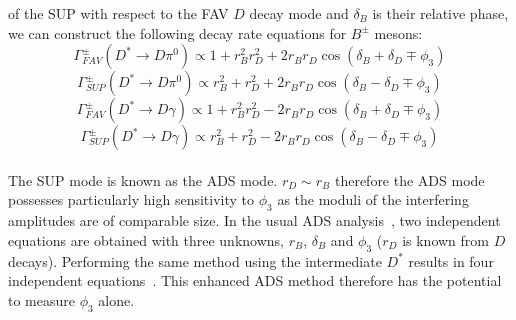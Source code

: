 \documentclass[oneside,12pt]{article}
\begin{document}
of the SUP with respect to the FAV $D$ decay mode and $\delta_{B}$ is their
relative phase, we can construct the following decay rate equations for
$B^{\pm}$ mesons:
  \begin{equation}
    \Gamma_{FAV}^{\pm}(D^{*}\rightarrow D\pi^{0})\propto 1 + r_{B}^{2}r_{D}^{2}
    + 2r_{B}r_{D}\cos(\delta_{B} + \delta_{D} \mp \phi_{3})
    \label{eq:DecayRateADSFAVpi0}
  \end{equation}
  \begin{equation}
    \Gamma_{SUP}^{\pm}(D^{*}\rightarrow D\pi^{0})\propto r_{B}^{2} + r_{D}^{2} +
    2r_{B}r_{D}\cos(\delta_{B} - \delta_{D} \mp \phi_{3})
    \label{eq:DecayRateADSSUPpi0}
  \end{equation}
  \begin{equation}
    \Gamma_{FAV}^{\pm}(D^{*}\rightarrow D\gamma)\propto 1 + r_{B}^{2}r_{D}^{2} -
    2r_{B}r_{D}\cos(\delta_{B} + \delta_{D} \mp \phi_{3})
    \label{eq:DecayRateADSFAVgamma}
  \end{equation}
  \begin{equation}
    \Gamma_{SUP}^{\pm}(D^{*}\rightarrow D\gamma)\propto r_{B}^{2} + r_{D}^{2} -
    2r_{B}r_{D}\cos(\delta_{B} - \delta_{D} \mp \phi_{3})
    \label{eq:DecayRateADSSUPgamma}
  \end{equation}
\\
\noindent The SUP mode is known as the ADS mode. $r_{D} \sim r_{B}$ therefore
the ADS mode possesses particularly high sensitivity to $\phi_3$ as the moduli
of the interfering amplitudes are of comparable size. In the usual ADS
analysis~\cite{ADSRef}, two independent equations are obtained with three
unknowns, $r_B$, $\delta_B$ and $\phi_3$ ($r_{D}$ is known from $D$ decays).
Performing the same method using the intermediate $D^*$ results in four
independent equations~\cite{ADSDstar}. This enhanced ADS method therefore has
the potential to measure $\phi_3$ alone.
\end{document}
